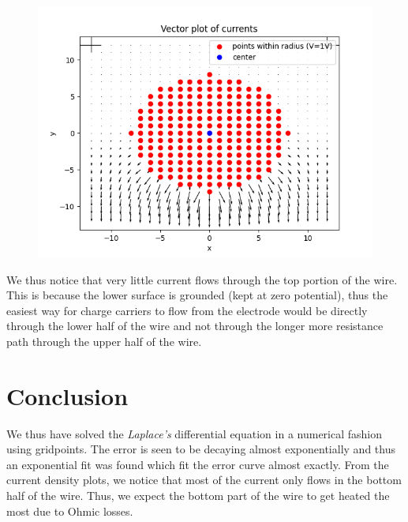 \documentclass[11pt, a4paper]{article}
\begin{document}
\begin{figure}[H]
     \centering
     \includegraphics[scale=0.8]{Figure_9.png}
\end{figure}

We thus notice that very little current flows through the top portion of the wire. This is because the lower surface is grounded (kept at zero potential), thus the easiest way for charge carriers to flow from the electrode would be directly through the lower half of the wire and not through the longer more resistance path through the upper half of the wire. 


\section{Conclusion}
We thus have solved the \textit{Laplace's} differential equation in a numerical fashion using gridpoints. The error is seen to be decaying almost exponentially and thus an exponential fit was found which fit the error curve almost exactly. From the current density plots, we notice that most of the current only flows in the bottom half of the wire. Thus, we expect the bottom part of the wire to get heated the most due to Ohmic losses.
\end{document}
